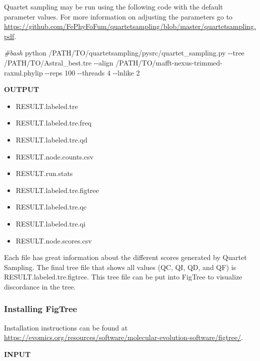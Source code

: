 \documentclass[
  12pt,
]{article}
\newenvironment{Shaded}{\begin{snugshade}}{\end{snugshade}}
\newcommand{\AttributeTok}[1]{\textcolor[rgb]{0.13,0.29,0.53}{#1}}
\newcommand{\CommentTok}[1]{\textcolor[rgb]{0.56,0.35,0.01}{\textit{#1}}}
\newcommand{\ExtensionTok}[1]{#1}
\newcommand{\NormalTok}[1]{#1}
\providecommand{\tightlist}{%
  \setlength{\itemsep}{0pt}\setlength{\parskip}{0pt}}
\begin{document}
Quartet sampling may be run using the following code with the default parameter values. For more information on adjusting the parameters go to \url{https://github.com/FePhyFoFum/quartetsampling/blob/master/quartetsampling.pdf}.

\begin{Shaded}
\begin{Highlighting}[]
\CommentTok{\#bash}
\ExtensionTok{python}\NormalTok{ /PATH/TO/quartetsampling/pysrc/quartet\_sampling.py }\AttributeTok{{-}{-}tree}\NormalTok{ /PATH/TO/Astral\_best.tre }\AttributeTok{{-}{-}align}\NormalTok{ /PATH/TO/mafft{-}nexus{-}trimmed{-}raxml.phylip }\AttributeTok{{-}{-}reps}\NormalTok{ 100 }\AttributeTok{{-}{-}threads}\NormalTok{ 4 }\AttributeTok{{-}{-}lnlike}\NormalTok{ 2}
\end{Highlighting}
\end{Shaded}

\textbf{OUTPUT}

\begin{itemize}
\tightlist
\item
  RESULT.labeled.tre
\item
  RESULT.labeled.tre.freq
\item
  RESULT.labeled.tre.qd
\item
  RESULT.node.counts.csv
\item
  RESULT.run.stats
\item
  RESULT.labeled.tre.figtree
\item
  RESULT.labeled.tre.qc
\item
  RESULT.labeled.tre.qi
\item
  RESULT.node.scores.csv
\end{itemize}

Each file has great information about the different scores generated by Quartet Sampling. The final tree file that shows all values (QC, QI, QD, and QF) is RESULT.labeled.tre.figtree. This tree file can be put into FigTree to visualize discordance in the tree.

\hypertarget{installing-figtree-3}{%
\subsubsection{Installing FigTree}\label{installing-figtree-3}}

Installation instructions can be found at \url{https://evomics.org/resources/software/molecular-evolution-software/figtree/}.

\textbf{INPUT}
\end{document}
